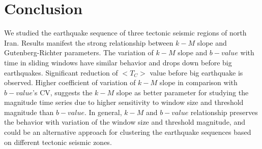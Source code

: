 
\section{Conclusion}
\noindent
We studied the earthquake sequence of three tectonic seismic regions of north Iran. Results manifest the strong relationship between $k-M$ slope and Gutenberg-Richter parameters. The variation of $k-M$ slope and $b-value$ with time in sliding windows have similar behavior and drops down before big earthquakes. Significant reduction of $<T_C>$ value before big earthquake is observed. Higher coefficient of variation of $k-M$ slope in comparison with $b-value$'s CV, suggests the $k-M$ slope as better parameter for studying the magnitude time series due to higher sensitivity to window size and threshold magnitude than $b-value$. In general, $k-M$ and $b-value$ relationship preserves the behavior with variation of the window size and threshold magnitude, and could be an alternative approach for clustering the earthquake sequences based on different tectonic seismic zones.